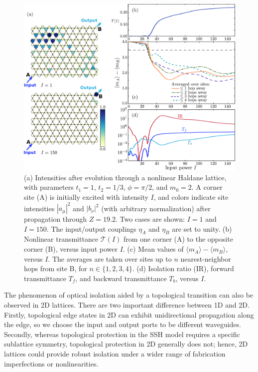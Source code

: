\documentclass[aps,prx,twocolumn,superscriptaddress]{revtex4-1}
\newcommand{\figfullwidth}{16cm}
\begin{document}
\begin{figure}
  \centering
  \includegraphics[width=\figfullwidth]{TB/haldane.pdf}
  \caption{(a) Intensities after evolution through a nonlinear Haldane lattice, with parameters $t_1 = 1$, $t_2 = 1/3$, $\phi = \pi/2$, and $m_0 = 2$.  A corner site (A) is initially excited with intensity $I$, and colors indicate site intensities $|a_\mu|^2$ and $|b_\nu|^2$ (with arbitrary normalization) after propagation through $Z = 19.2$. Two cases are shown: $I = 1$ and $I = 150$.  The input/output couplings $\eta_A$ and $\eta_B$ are set to unity.  (b) Nonlinear transmittance $\mathcal{T}(I)$ from one corner (A) to the opposite corner (B), versus input power $I$.  (c) Mean values of $\langle m_A\rangle - \langle m_B\rangle$, versus $I$.  The averages are taken over sites up to $n$ nearest-neighbor hops from site B, for $n \in \{1,2,3,4\}$.  (d) Isolation ratio (IR), forward transmittance $T_f$, and backward transmittance $T_b$, versus $I$. }
\label{fig:haldane}
\end{figure}

The phenomenon of optical isolation aided by a topological transition can also be observed in 2D lattices.  There are two important difference between 1D and 2D.  Firstly, topological edge states in 2D can exhibit unidirectional propagation along the edge, so we choose the input and output ports to be different waveguides.  Secondly, whereas topological protection in the SSH model requires a specific sublattice symmetry, topological protection in 2D generally does not; hence, 2D lattices could provide robust isolation under a wider range of fabrication imperfections or nonlinearities.
\end{document}
